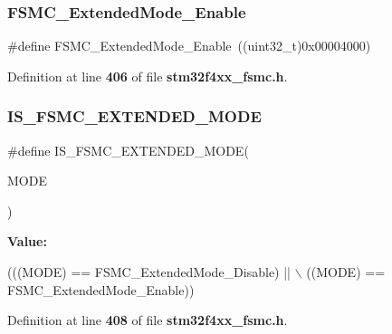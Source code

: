 \subsubsection{F\+S\+M\+C\+\_\+\+Extended\+Mode\+\_\+\+Enable}
{\footnotesize\ttfamily \#define F\+S\+M\+C\+\_\+\+Extended\+Mode\+\_\+\+Enable~((uint32\+\_\+t)0x00004000)}



Definition at line \textbf{ 406} of file \textbf{ stm32f4xx\+\_\+fsmc.\+h}.

\mbox{\label{group__FSMC__Extended__Mode_ga79849ea07bf2a8f09989a6babd9e66e2}} 
\subsubsection{I\+S\+\_\+\+F\+S\+M\+C\+\_\+\+E\+X\+T\+E\+N\+D\+E\+D\+\_\+\+M\+O\+DE}
{\footnotesize\ttfamily \#define I\+S\+\_\+\+F\+S\+M\+C\+\_\+\+E\+X\+T\+E\+N\+D\+E\+D\+\_\+\+M\+O\+DE(\begin{DoxyParamCaption}\item[{}]{M\+O\+DE }\end{DoxyParamCaption})}

{\bfseries Value\+:}
\begin{DoxyCode}
(((MODE) == FSMC_ExtendedMode_Disable) || \(\backslash\)
                                     ((MODE) == FSMC_ExtendedMode_Enable))
\end{DoxyCode}


Definition at line \textbf{ 408} of file \textbf{ stm32f4xx\+\_\+fsmc.\+h}.

